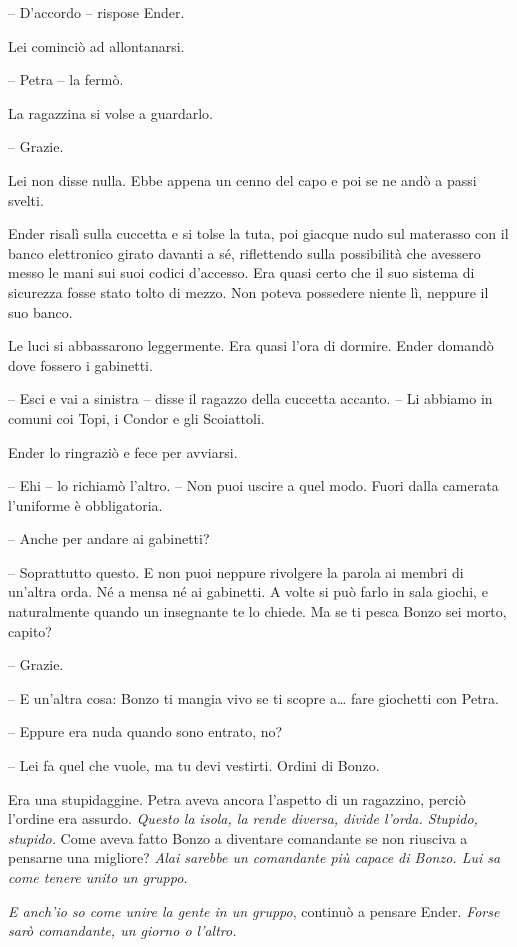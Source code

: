 {-- D'accordo -- rispose Ender.}

{Lei cominciò ad allontanarsi.}

{-- Petra -- la fermò.}

{La ragazzina si volse a guardarlo.}

{-- Grazie.}

{Lei non disse nulla. Ebbe appena un cenno del capo e poi se ne andò a
	passi svelti.}

{Ender risalì sulla cuccetta e si tolse la tuta, poi giacque nudo sul
	materasso con il banco elettronico girato davanti a sé, riflettendo
	sulla possibilità che avessero messo le mani sui suoi codici d'accesso.
	Era quasi certo che il suo sistema di sicurezza fosse stato tolto di
	mezzo. Non poteva possedere niente lì, neppure il suo banco.}

{Le luci si abbassarono leggermente. Era quasi l'ora di dormire. Ender
	domandò dove fossero i gabinetti.}

{-- Esci e vai a sinistra -- disse il ragazzo della cuccetta accanto. --
	Li abbiamo in comuni coi Topi, i Condor e gli Scoiattoli.}

{Ender lo ringraziò e fece per avviarsi.}

{-- Ehi -- lo richiamò l'altro. -- Non puoi uscire a quel modo. Fuori
	dalla camerata l'uniforme è obbligatoria.}

{-- Anche per andare ai gabinetti?}

{-- Soprattutto questo. E non puoi neppure rivolgere la parola ai membri
	di un'altra orda. Né a mensa né ai gabinetti. A volte si può farlo in
	sala giochi, e naturalmente quando un insegnante te lo chiede. Ma se ti
	pesca Bonzo sei morto, capito?}

{-- Grazie.}

{-- E un'altra cosa: Bonzo ti mangia vivo se ti scopre a\ldots{} fare
	giochetti con Petra.}

{-- Eppure era nuda quando sono entrato, no?}

{-- Lei fa quel che vuole, ma tu devi vestirti. Ordini di Bonzo.}

{Era una stupidaggine. Petra aveva ancora l'aspetto di un ragazzino,
	perciò l'ordine era assurdo. \emph{Questo la isola, la rende diversa,
		divide l'orda. Stupido, stupido.} Come aveva fatto Bonzo a diventare
	comandante se non riusciva a pensarne una migliore? \emph{Alai sarebbe
		un comandante più capace di Bonzo. Lui sa come tenere unito un gruppo.}}

\emph{{E anch'io so come unire la gente in un gruppo}}{, \emph{}
	continuò a pensare Ender. \emph{Forse sarò comandante, un giorno o
		l'altro.}}

